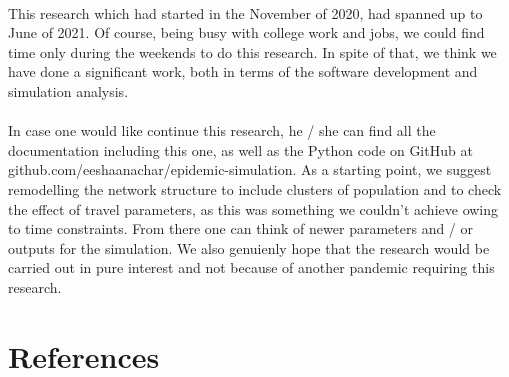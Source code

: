 \documentclass[12pt, a4paper]{extarticle}
\begin{document}
        \paragraph{} This research which had started in the November of 2020, had spanned up to June of 2021. Of course, being busy with college work and jobs, we could find time only during the weekends to do this research. In spite of that, we think we have done a significant work, both in terms of the software development and simulation analysis.
        \paragraph{} In case one would like continue this research, he / she can find all the documentation including this one, as well as the Python code on GitHub at github.com/eeshaanachar/epidemic-simulation. As a starting point, we suggest remodelling the network structure to include clusters of population and to check the effect of travel parameters, as this was something we couldn't achieve owing to time constraints. From there one can think of newer parameters and / or outputs for the simulation. We also genuienly hope that the research would be carried out in pure interest and not because of another pandemic requiring this research.
	
	\newpage
	\section{References}
\end{document}
